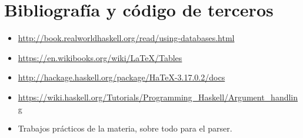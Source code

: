 \documentclass[a4paper,12pt]{article}
\begin{document}
\section{Bibliografía y código de terceros}
\begin{itemize}
\item \url{http://book.realworldhaskell.org/read/using-databases.html}
\item \url{https://en.wikibooks.org/wiki/LaTeX/Tables}
\item \url{http://hackage.haskell.org/package/HaTeX-3.17.0.2/docs}
\item \url{https://wiki.haskell.org/Tutorials/Programming_Haskell/Argument_handling}
\item Trabajos prácticos de la materia, sobre todo para el parser.
\end{itemize}
\end{document}
